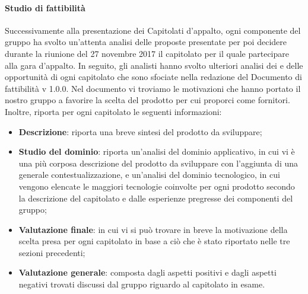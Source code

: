 \paragraph{Studio di fattibilità}\Spazio
Successivamente alla presentazione dei Capitolati d'appalto, ogni componente del gruppo ha svolto un'attenta analisi delle proposte presentate per poi decidere durante la riunione del 27 novembre 2017 il capitolato per il quale partecipare alla gara d'appalto. In seguito, gli analisti hanno svolto ulteriori analisi dei  e delle opportunità di ogni capitolato che sono sfociate nella redazione del Documento di fattibilità v 1.0.0. Nel documento vi troviamo le motivazioni che hanno portato il nostro gruppo a favorire la scelta del prodotto per cui proporci come fornitori. Inoltre, riporta per ogni capitolato le seguenti informazioni:
\begin{itemize}
 	\item\textbf{{Descrizione}}: riporta una breve sintesi del prodotto da sviluppare;
 	\item\textbf{{Studio del dominio}}: riporta un'analisi del dominio applicativo, in cui vi è una più corposa descrizione del prodotto da sviluppare con l'aggiunta di una generale contestualizzazione, e un'analisi del dominio tecnologico, in cui vengono elencate le maggiori tecnologie coinvolte per ogni prodotto secondo la descrizione del capitolato e dalle esperienze pregresse dei componenti del gruppo;
 	\item\textbf{{Valutazione finale}}: in cui vi si può trovare in breve la motivazione della scelta presa per ogni capitolato in base a ciò che è stato riportato nelle tre sezioni precedenti;
 	\item\textbf{{Valutazione generale}}: composta dagli aspetti positivi e dagli aspetti negativi trovati discussi dal gruppo riguardo al capitolato in esame.
\end{itemize}
